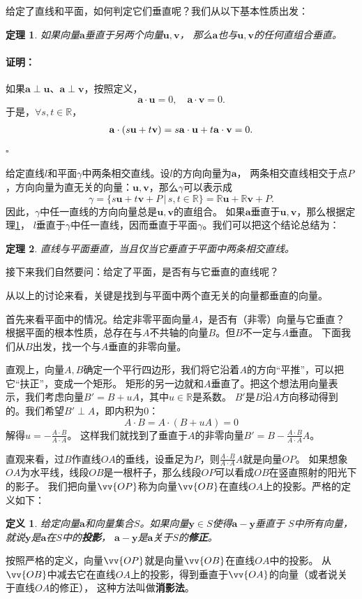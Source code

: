 \documentclass[12pt,UTF8]{ctexbook}
\newtheorem{df}{定义}[section]
\newtheorem{tm}{定理}[section]
\renewenvironment{proof}{\paragraph{\textbf{证明：}}}{\hfill$\square$}
\begin{document}
给定了直线和平面，如何判定它们垂直呢？我们从以下基本性质出发：
\begin{tm}\label{tm:1-3-10}
    如果向量$\mathbf{a}$垂直于另两个向量$\mathbf{u},\mathbf{v}$，
    那么$\mathbf{a}$也与$\mathbf{u},\mathbf{v}$的任何直组合垂直。
\end{tm}
\begin{proof}
    如果$\mathbf{a}\perp \mathbf{u}$、$\mathbf{a}\perp \mathbf{v}$，按照定义，
    $$ \mathbf{a}\cdot \mathbf{u} = 0, \quad \mathbf{a}\cdot \mathbf{v} = 0. $$
    于是，$\forall s, t\in\mathbb{R}$，
    \begin{align}
        \mathbf{a}\cdot (s\mathbf{u} + t\mathbf{v}) = s\mathbf{a}\cdot \mathbf{u} + t\mathbf{a}\cdot \mathbf{v} = 0. \notag
    \end{align}
\end{proof}

给定直线$l$和平面$\gamma$中两条相交直线。设$l$的方向向量为$\mathbf{a}$，
两条相交直线相交于点$P$，方向向量为直无关的向量：$\mathbf{u},\mathbf{v}$，那么$\gamma$可以表示成
$$ \gamma = \{s\mathbf{u} + t\mathbf{v} + P \, | \, s,t\in\mathbb{R}\} = \mathbb{R}\mathbf{u} + \mathbb{R}\mathbf{v} + P. $$
因此，$\gamma$中任一直线的方向向量总是$\mathbf{u},\mathbf{v}$的直组合。
如果$\mathbf{a}$垂直于$\mathbf{u},\mathbf{v}$，那么根据定理\ref{tm:1-3-10}，
$l$垂直于$\gamma$中任一直线，因而垂直于平面$\gamma$。我们可以把这个结论总结为：
\begin{tm}\label{tm:1-3-20}
    直线与平面垂直，当且仅当它垂直于平面中两条相交直线。
\end{tm}
接下来我们自然要问：给定了平面，是否有与它垂直的直线呢？

从以上的讨论来看，关键是找到与平面中两个直无关的向量都垂直的向量。

首先来看平面中的情况。给定非零平面向量$A$，是否有（非零）向量与它垂直？
根据平面的根本性质，总存在与$A$不共轴的向量$B$。但$B$不一定与$A$垂直。
下面我们从$B$出发，找一个与$A$垂直的非零向量。

直观上，向量$A,B$确定一个平行四边形，我们将它沿着$A$的方向“平推”，可以把它“扶正”，变成一个矩形。
矩形的另一边就和$A$垂直了。把这个想法用向量表示，我们考虑向量$B' = B + uA$，其中$u\in\mathbb{R}$是系数。
$B'$是$B$沿$A$方向移动得到的。我们希望$B'\perp A$，即内积为$0$：
$$ A\cdot B = A\cdot (B + uA) = 0$$
解得$u = -\frac{A\cdot B}{A\cdot A}$。
这样我们就找到了垂直于$A$的非零向量$B' = B -\frac{A\cdot B}{A\cdot A}A$。

直观来看，过$B$作直线$OA$的垂线，设垂足为$P$，则$\frac{A\cdot B}{A\cdot A}A$就是向量$OP$。
如果想象$OA$为水平线，线段$OB$是一根杆子，那么线段$OP$可以看成$OB$在竖直照射的阳光下的影子。
我们把向量$\vv{OP}$称为向量$\vv{OB}$在直线$OA$上的投影。严格的定义如下：
\begin{df}\label{df:1-3-20}
    给定向量$\mathbf{a}$和向量集合$S$。如果向量$\mathbf{y}\in S$使得$\mathbf{a} - \mathbf{y}$垂直于
    $S$中所有向量，就说$\mathbf{y}$是$\mathbf{a}$在$S$中的\textbf{投影}，
    $\mathbf{a} - \mathbf{y}$是$\mathbf{a}$关于$S$的\textbf{修正}。
\end{df}
按照严格的定义，向量$\vv{OP}$就是向量$\vv{OB}$在直线$OA$中的投影。
从$\vv{OB}$中减去它在直线$OA$上的投影，得到垂直于$\vv{OA}$的向量（或者说关于直线$OA$的修正），
这种方法叫做\textbf{消影法}。
\end{document}

